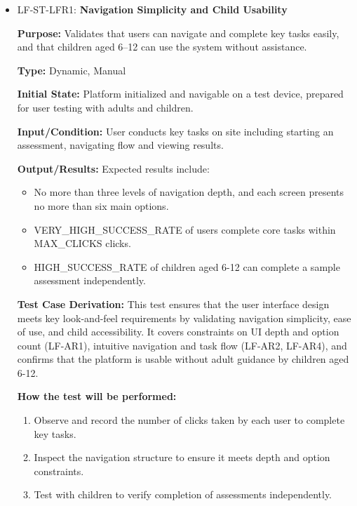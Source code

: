 \documentclass[12pt, titlepage]{article}
\begin{document}
\begin{itemize} 
  \item LF-ST-LFR1: \textbf{Navigation Simplicity and Child Usability}
  \begin{mdframed}[linewidth=0.5mm] 
    \textbf{Purpose:} Validates that users can navigate and complete key tasks easily, and that children aged 6–12 can use the system without assistance. \par
    \textbf{Type:} Dynamic, Manual \par 
    \textbf{Initial State:} Platform initialized and navigable on a test device, prepared for user testing with adults and children. \par 
    \textbf{Input/Condition:} User conducts key tasks on site including starting an assessment, navigating flow and viewing results. \par 
    \textbf{Output/Results:} Expected results include: 
    \begin{itemize} 
      \item No more than three levels of navigation depth, and each screen presents no more than six main options. 
      \item VERY\_HIGH\_SUCCESS\_RATE of users complete core tasks within \\ MAX\_CLICKS clicks. 
      \item HIGH\_SUCCESS\_RATE of children aged 6-12 can complete a sample \\ assessment independently. 
    \end{itemize} \par
    \textbf{Test Case Derivation:} This test ensures that the user interface design meets key look-and-feel requirements by validating navigation simplicity, ease of use, and child accessibility. It covers constraints on UI depth and option count (LF-AR1), intuitive navigation and task flow (LF-AR2, LF-AR4), and confirms that the platform is usable without adult guidance by children aged 6-12. \par
    \textbf{How the test will be performed:} 
    \begin{enumerate}[noitemsep] 
      \item Observe and record the number of clicks taken by each user to complete key tasks. 
      \item Inspect the navigation structure to ensure it meets depth and option \\ constraints. 
      \item Test with children to verify completion of assessments independently. 
    \end{enumerate} 
  \end{mdframed}


\end{itemize}
\end{document}
